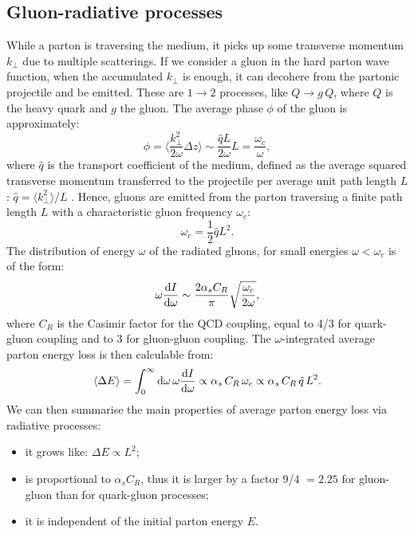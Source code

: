 \subsection{Gluon-radiative processes}
While a parton is traversing the medium, it picks up some transverse 
momentum $k_{\perp}$ due to multiple scatterings. 
If we consider a gluon in the hard parton wave function, when the 
accumulated $k_{\perp}$ is enough, it can decohere from the partonic projectile and be emitted.
These are $1 \rightarrow 2$ processes, like $Q \rightarrow g\, Q$, 
where $Q$ is the heavy quark and $g$ the gluon.
The average phase $\phi$ of the gluon is approximately:
\begin{equation}
\label{eq:gluonPhase}
\phi = {\Big \langle} \frac{k_{\perp}^2}{2\omega} \Delta z {\Big \rangle} \sim \frac{\hat{q} L}{2 \omega} L = \frac{\omega_c}{\omega},
\end{equation}
where $\hat{q}$ is the transport coefficient of the medium, 
defined as the average squared transverse 
momentum transferred to the projectile per average unit path 
length $L$: $\hat{q} = \langle k_{\perp}^2 \rangle / L$ \cite{Salgado:2003gb,}.
Hence, gluons are emitted from the parton traversing a finite path 
length $L$ with a characteristic gluon frequency $\omega_c$:
\begin{equation}
\label{eq:gluonPhase}
\omega_c = \frac{1}{2} \hat{q} L^2.
\end{equation}
The distribution of energy $\omega$ of the radiated gluons, 
for small energies $\omega < \omega_c$ is of the form:
\begin{equation}
\label{eq:gluonEnDistrb}
\omega \frac{{\rm d} I}{{\rm d} \omega} \sim \frac{2 \alpha_s C_R}{\pi} \sqrt{ \frac{\omega_c}{2 \omega}},
\end{equation}
where $C_R$ is the Casimir factor for the QCD coupling, 
equal to 4/3 for quark-gluon coupling and to 3 for gluon-gluon coupling.
The $\omega$-integrated average parton energy loss is then calculable from:
\begin{equation}
\label{eq:RadEnLoss}
\langle \Delta E \rangle = \int_0^\infty {\rm d} \omega \, \omega \frac{{\rm d} I}{{\rm d} \omega} \propto \alpha_s \, C_R \, \omega_c \propto \alpha_s \, C_R \, \hat{q} \, L^2. 
\end{equation}
We can then summarise the main properties of average parton 
energy loss via radiative processes:
\begin{itemize}
\item it grows like: $\Delta E \propto L^2$;
\item is proportional to $\alpha_s C_R$, thus it is larger by a factor 
9/4 $ = 2.25$ for gluon-gluon than for quark-gluon processes;
\item it is independent of the initial parton energy $E$.
\end{itemize}
